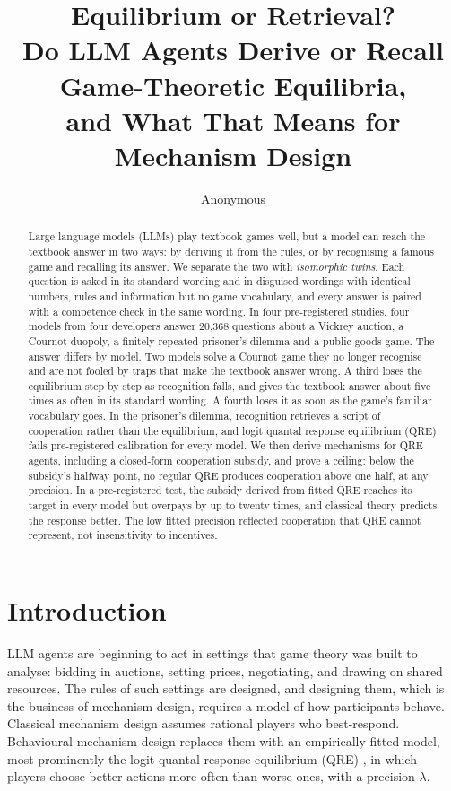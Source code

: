 \documentclass[10pt]{article}
\title{\textbf{Equilibrium or Retrieval?}\\[2pt]
\large Do LLM Agents Derive or Recall Game-Theoretic Equilibria,\\
and What That Means for Mechanism Design}
\author{\name Anonymous}
\theoremstyle{definition}
\theoremstyle{remark}
\newcommand{\lam}{\lambda}
\begin{document}
\maketitle
{\renewcommand{\thefootnote}{}}

\begin{abstract}
Large language models (LLMs) play textbook games well, but a model can reach the textbook answer
in two ways: by deriving it from the rules, or by recognising a famous game and recalling its
answer. We separate the two with \emph{isomorphic twins}. Each question is asked in its standard
wording and in disguised wordings with identical numbers, rules and information but no game
vocabulary, and every answer is paired with a competence check in the same wording. In four
pre-registered studies, four models from four developers answer 20{,}368 questions about a Vickrey
auction, a Cournot duopoly, a finitely repeated prisoner's dilemma and a public goods game. The
answer differs by model. Two models solve a Cournot game they no longer recognise and are not
fooled by traps that make the textbook answer wrong. A third loses the equilibrium step by step
as recognition falls, and gives the textbook answer about five times as often in its standard wording. A
fourth loses it as soon as the game's familiar vocabulary goes. In the prisoner's dilemma, recognition retrieves
a script of cooperation rather than the equilibrium, and logit quantal response equilibrium
(QRE) fails pre-registered calibration for every model. We then derive mechanisms for QRE
agents, including a closed-form cooperation subsidy, and prove a ceiling: below the subsidy's
halfway point, no regular QRE produces cooperation above one half, at any precision. In a
pre-registered test, the subsidy derived from fitted QRE reaches its target in every model but
overpays by up to twenty times, and classical theory predicts the response better. The low fitted
precision reflected cooperation that QRE cannot represent, not insensitivity to incentives.
\end{abstract}


\section{Introduction}

LLM agents are beginning to act in settings that game theory was built to analyse: bidding in
auctions, setting prices, negotiating, and drawing on shared resources. The rules of such
settings are designed, and designing them, which is the business of mechanism design, requires a
model of how participants behave. Classical mechanism design assumes rational players who
best-respond. Behavioural mechanism design replaces them with an empirically fitted model, most
prominently the logit quantal response equilibrium (QRE) \citep{mckelvey1995qre,goeree2016qre},
in which players choose better actions more often than worse ones, with a precision $\lam$.
\end{document}
